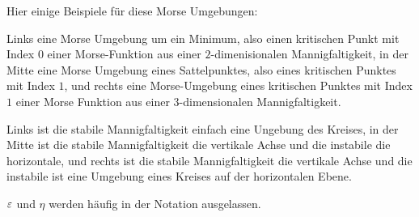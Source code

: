 \begin{definition}
    Hier einige Beispiele für diese Morse Umgebungen:


    Links eine Morse Umgebung um ein Minimum, also einen kritischen Punkt mit Index $0$ einer 
    Morse-Funktion aus einer $2$-dimenisionalen Mannigfaltigkeit, in der Mitte eine Morse Umgebung 
    eines Sattelpunktes, also eines kritischen Punktes mit Index $1$, und rechts eine Morse-Umgebung 
    eines kritischen Punktes mit Index $1$ einer Morse Funktion aus einer $3$-dimensionalen 
    Mannigfaltigkeit.

    Links ist die stabile Mannigfaltigkeit einfach eine Ungebung des Kreises, in der Mitte ist die 
    stabile Mannigfaltigkeit die vertikale Achse und die instabile die horizontale, und rechts
    ist die stabile Mannigfaltigkeit die vertikale Achse und die instabile ist eine Umgebung 
    eines Kreises auf der horizontalen Ebene.
    
    $\varepsilon$ und $\eta$ werden häufig in der Notation ausgelassen.
\end{definition}

